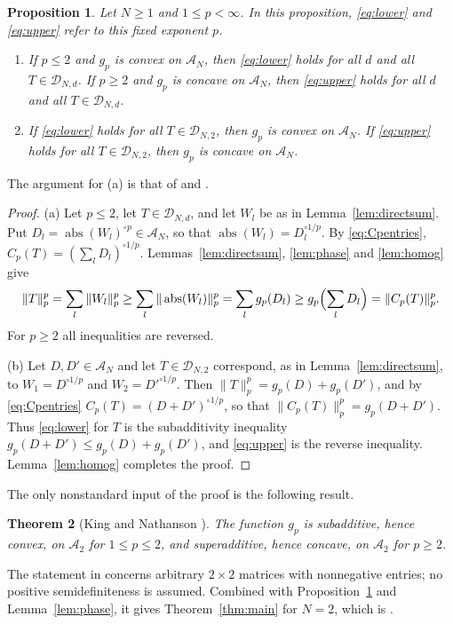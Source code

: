 \documentclass[11pt]{amsart}
\newtheorem{theorem}{Theorem}[section]
\newtheorem{proposition}[theorem]{Proposition}
\theoremstyle{definition}
\theoremstyle{remark}
\numberwithin{equation}{section}
\newcommand{\abs}{\operatorname{abs}}
\newcommand{\cA}{\mathcal{A}}
\newcommand{\cD}{\mathcal{D}}
\begin{document}
\begin{proposition}\label{prop:equiv}
Let $N\ge1$ and $1\le p<\infty$. In this proposition, \eqref{eq:lower} and \eqref{eq:upper} refer to this fixed exponent $p$.
\begin{enumerate}
\item[(a)] If $p\le2$ and $g_p$ is convex on $\cA_N$, then \eqref{eq:lower} holds for all $d$ and all $T\in\cD_{N,d}$. If $p\ge2$ and $g_p$ is concave on $\cA_N$, then \eqref{eq:upper} holds for all $d$ and all $T\in\cD_{N,d}$.
\item[(b)] If \eqref{eq:lower} holds for all $T\in\cD_{N,2}$, then $g_p$ is convex on $\cA_N$. If \eqref{eq:upper} holds for all $T\in\cD_{N,2}$, then $g_p$ is concave on $\cA_N$.
\end{enumerate}
\end{proposition}

The argument for (a) is that of \cite[Section~2.1]{KN04} and \cite[Section~5]{Aud08}.

\begin{proof}
(a) Let $p\le2$, let $T\in\cD_{N,d}$, and let $W_l$ be as in Lemma~\ref{lem:directsum}. Put $D_l=\abs(W_l)^{\circ p}\in\cA_N$, so that $\abs(W_l)=D_l^{\circ1/p}$. By \eqref{eq:Cpentries}, $C_p(T)=(\sum_lD_l)^{\circ1/p}$. Lemmas~\ref{lem:directsum}, \ref{lem:phase} and \ref{lem:homog} give
\[
\|T\|_p^p=\sum_l\|W_l\|_p^p\ge\sum_l\|\abs(W_l)\|_p^p=\sum_lg_p(D_l)\ge g_p\Bigl(\sum_lD_l\Bigr)=\|C_p(T)\|_p^p .
\]
For $p\ge2$ all inequalities are reversed.

(b) Let $D,D'\in\cA_N$ and let $T\in\cD_{N,2}$ correspond, as in Lemma~\ref{lem:directsum}, to $W_1=D^{\circ1/p}$ and $W_2=D'^{\circ1/p}$. Then $\|T\|_p^p=g_p(D)+g_p(D')$, and by \eqref{eq:Cpentries} $C_p(T)=(D+D')^{\circ1/p}$, so that $\|C_p(T)\|_p^p=g_p(D+D')$. Thus \eqref{eq:lower} for $T$ is the subadditivity inequality $g_p(D+D')\le g_p(D)+g_p(D')$, and \eqref{eq:upper} is the reverse inequality. Lemma~\ref{lem:homog} completes the proof.
\end{proof}

The only nonstandard input of the proof is the following result.

\begin{theorem}[King and Nathanson {\cite[Lemma~3]{KN04}}]\label{thm:KN}
The function $g_p$ is subadditive, hence convex, on $\cA_2$ for $1\le p\le2$, and superadditive, hence concave, on $\cA_2$ for $p\ge2$.
\end{theorem}

The statement in \cite{KN04} concerns arbitrary $2\times2$ matrices with nonnegative entries; no positive semidefiniteness is assumed. Combined with Proposition~\ref{prop:equiv} and Lemma~\ref{lem:phase}, it gives Theorem~\ref{thm:main} for $N=2$, which is \cite[Theorem~1]{KN04}.
\end{document}
